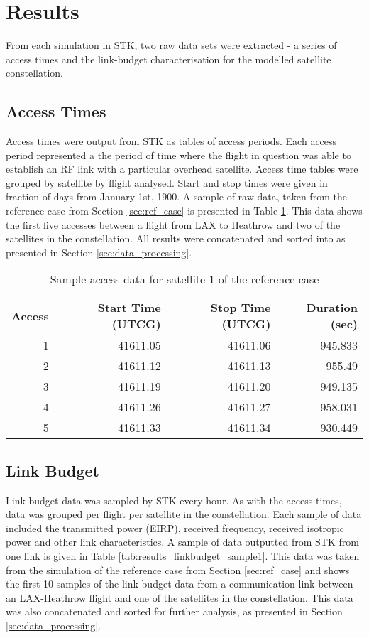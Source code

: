 \section{Results}
From each simulation in STK, two raw data sets were extracted - a series of access times and the link-budget characterisation for the modelled satellite constellation.

\subsection{Access Times}
Access times were output from STK as tables of access periods. Each access period represented a the period of time where the flight in question was able to establish an RF link with a particular overhead satellite. Access time tables were grouped by satellite by flight analysed. Start and stop times were given in fraction of days from January 1st, 1900. A sample of raw data, taken from the reference case from Section \ref{sec:ref_case} is presented in Table \ref{tab:results_access_sample1}. This data shows the first five accesses between a flight from LAX to Heathrow and two of the satellites in the constellation. All results were concatenated and sorted into as presented in Section \ref{sec:data_processing}.
\begin{table}[H]
  \centering
  \caption{Sample access data for satellite 1 of the reference case}
    \begin{tabular}{rrrr}
    \toprule
    Access & Start Time (UTCG) & Stop Time (UTCG) & Duration (sec) \\
    \midrule
    1     & 41611.05 & 41611.06 & 945.833 \\
    2     & 41611.12 & 41611.13 & 955.49 \\
    3     & 41611.19 & 41611.20 & 949.135 \\
    4     & 41611.26 & 41611.27 & 958.031 \\
    5     & 41611.33 & 41611.34 & 930.449 \\
    \bottomrule
    \end{tabular}%
  \label{tab:results_access_sample1}%
\end{table}%


\subsection{Link Budget}
Link budget data was sampled by STK every hour. As with the access times, data was grouped per flight per satellite in the constellation. Each sample of data included the transmitted power (EIRP), received frequency, received isotropic power and other link characteristics. A sample of data outputted from STK from one link is given in Table \ref{tab:results_linkbudget_sample1}. This data was taken from the simulation of the reference case from Section \ref{sec:ref_case} and shows the first 10 samples of the link budget data from a communication link between an LAX-Heathrow flight and one of the satellites in the constellation. This data was also concatenated and sorted for further analysis, as presented in Section \ref{sec:data_processing}.


